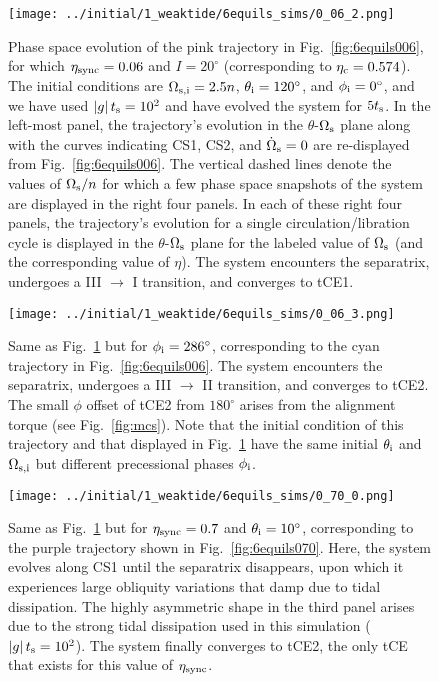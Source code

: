 \documentclass[
        fleqn,
        usenatbib,
        referee
    ]{mnras}
\newcommand*{\abs}[1]{\left|#1\right|}
\newlength{\colummwidth}
\begin{document}
\begin{figure}
    \centering
    \texttt{[image: ../initial/1\_weaktide/6equils\_sims/0\_06\_2.png]}
    \caption{Phase space evolution of the pink trajectory in
    Fig.~\ref{fig:6equils006}, for which $\eta_{\rm sync} = 0.06$ and $I =
    20^\circ$ (corresponding to $\eta_{\rm c} = 0.574$). The initial conditions
    are $\Omega_{\rm s, i} = 2.5n$, $\theta_{\rm i} = 120^\circ$, and $\phi_{\rm
    i} = 0^\circ$, and we have used $\abs{g}t_{\rm s} = 10^2$ and have evolved
    the system for $5t_{\rm s}$. In the left-most panel, the trajectory's
    evolution in the $\theta$-$\Omega_{\rm s}$ plane along with the curves
    indicating CS1, CS2, and $\dot{\Omega}_{\rm s} = 0$ are re-displayed from
    Fig.~\ref{fig:6equils006}. The vertical dashed lines denote the values of
    $\Omega_{\rm s} / n$ for which a few phase space snapshots of the system are
    displayed in the right four panels. In each of these right four panels, the
    trajectory's evolution for a single circulation/libration cycle is displayed
    in the $\theta$-$\Omega_{\rm s}$ plane for the labeled value of $\Omega_{\rm
    s}$ (and the corresponding value of $\eta$). The system encounters the
    separatrix, undergoes a III $\to$ I transition, and converges to tCE1.
    }\label{fig:trajs1}
\end{figure}
\begin{figure}
    \texttt{[image: ../initial/1\_weaktide/6equils\_sims/0\_06\_3.png]}
    \caption{Same as Fig.~\ref{fig:trajs1} but for $\phi_{\rm i} = 286^\circ$,
    corresponding to the cyan trajectory in Fig.~\ref{fig:6equils006}. The
    system encounters the separatrix, undergoes a III $\to$ II transition, and
    converges to tCE2. The small $\phi$ offset of tCE2 from $180^\circ$ arises
    from the alignment torque (see Fig.~\ref{fig:mcs}). Note that the initial
    condition of this trajectory and that displayed in Fig.~\ref{fig:trajs1}
    have the same initial $\theta_{\rm i}$ and $\Omega_{\rm s, i}$ but different
    precessional phases $\phi_{\rm i}$.
    }\label{fig:trajs2}
\end{figure}
\begin{figure}
    \texttt{[image: ../initial/1\_weaktide/6equils\_sims/0\_70\_0.png]}
    \caption{Same as Fig.~\ref{fig:trajs1} but for $\eta_{\rm sync} = 0.7$ and
    $\theta_{\rm i} = 10^\circ$, corresponding to the purple trajectory shown in
    Fig.~\ref{fig:6equils070}. Here, the system evolves along CS1 until the
    separatrix disappears, upon which it experiences large obliquity variations
    that damp due to tidal dissipation. The highly asymmetric shape in the third
    panel arises due to the strong tidal dissipation used in this simulation
    ($\abs{g}t_{\rm s} = 10^2$). The system finally converges to tCE2, the only
    tCE that exists for this value of $\eta_{\rm sync}$.}\label{fig:trajs3}
\end{figure}
\end{document}
